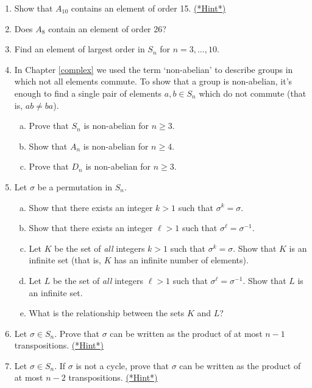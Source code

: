  
\begin{enumerate}
 
  
\item \label{ex:permute:Ad1}
Show that $A_{10}$ contains an element of order 15.
\hyperref[sec:permute:hints]{(*Hint*)}
 
 
\item
Does $A_8$ contain an element of order 26?
 
 
\item %
Find an element of largest order in $S_n$ for $n = 3, \ldots, 10$. 
 
  
 \item
In Chapter \ref{complex} we used the term `non-abelian' to describe groups in which not all elements commute. To show that a group is non-abelian, it's enough to find a single pair of elements $a, b \in S_n$ which do not commute (that is, $ab \neq ba$).
\begin{enumerate}[(a)]
\item
Prove that $S_n$ is non-abelian for $n \geq 3$. 
\item
Show that $A_n$ is non-abelian for $n \geq 4$.
\item
Prove that $D_n$ is non-abelian for $n \geq 3$.
 \end{enumerate} 

\item
Let $\sigma$ be a permutation in $S_n$.  
\begin{enumerate}[(a)]
\item
Show that there exists an integer $k>1$ such that $\sigma^k = \sigma$.
\item
Show that there exists an integer $\ell>1$ such that $\sigma^{\ell} = \sigma^{-1}$.
\item
Let $K$ be the set of \emph{all} integers $k>1$ such that $\sigma^k = \sigma$. Show that $K$ is an infinite set (that is, $K$ has an infinite number of elements).
\item
Let $L$ be the set of \emph{all} integers $\ell>1$ such that $\sigma^{\ell} = \sigma^{-1}$. Show that $L$ is an infinite set.
\item
What is the relationship between the sets $K$ and $L$?
\end{enumerate}


\item \label{ex:permute:Ad2}
Let $\sigma \in S_n$. Prove that $\sigma$ can be written as the
product of at most $n-1$ transpositions.
\hyperref[sec:permute:hints]{(*Hint*)}

\item \label{ex:permute:Ad3}
Let $\sigma \in S_n$. If $\sigma$ is not a cycle, prove that $\sigma$
can be written as the product of at most $n-2$ transpositions.
\hyperref[sec:permute:hints]{(*Hint*)}


\end{enumerate}
